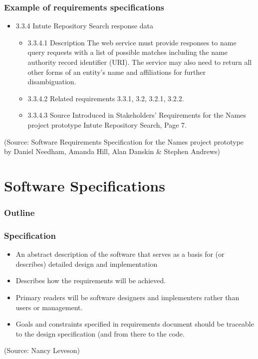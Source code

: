 \documentclass[10pt, handout]{beamer}
\begin{document}
\begin{frame}[fragile]
  \frametitle{Example of requirements specifications}
  \begin{itemize}
  \item 3.3.4 Intute Repository Search response data
    \begin{itemize}
    \item 3.3.4.1 Description
      The web service must provide responses to name query requests with a list of
      possible matches including the name authority record identifier (URI).
      The service may also need to return all other forms of an entity's name and
      affiliations for further disambiguation.
    \item 3.3.4.2 Related requirements
      3.3.1, 3.2, 3.2.1, 3.2.2.
    \item 3.3.4.3 Source
      Introduced in Stakeholders' Requirements for the Names project prototype
      Intute Repository Search, Page 7.
    \end{itemize}
  \end{itemize}

  \tiny (Source: Software Requirements Specification for the Names project
  prototype \\ by Daniel Needham, Amanda Hill, Alan Danskin \& Stephen Andrews)
\end{frame}

\section{Software Specifications}

\begin{frame}
  \frametitle{Outline}
  \tableofcontents[currentsection]
\end{frame}

\begin{frame}[fragile]
  \frametitle{Specification}
  \begin{itemize}
  \item An abstract description of the software that serves as a
    basis for (or describes) detailed design and implementation
  \item Describes how the requirements will be achieved.
  \item Primary readers will be software designers and
    implementers rather than users or management.
  \item Goals and constraints specified in requirements document
    should be traceable to the design specification (and from
    there to the code.
  \end{itemize}
\tiny (Source: Nancy Leveson)
\end{frame}
\end{document}
